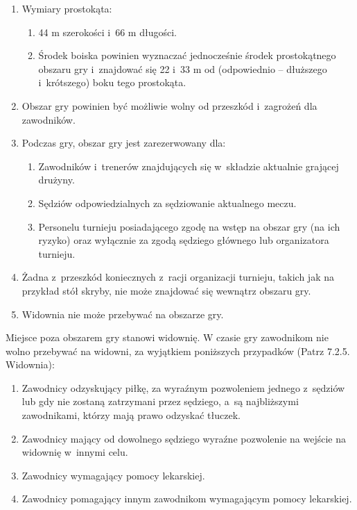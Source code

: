 \documentclass[12pt,a4paper]{article}
\renewcommand{\paragraph}[1]{
  \oldparagraph{#1}%
  \leftskip2cm
}
\begin{document}
\begin{enumerate}
	\item Wymiary prostokąta:
	      \begin{enumerate}
		      \item 44 m szerokości i~66 m długości.
		      \item Środek boiska powinien wyznaczać jednocześnie środek prostokątnego
		            obszaru gry i~znajdować się 22 i~33 m od (odpowiednio -- dłuższego i~krótszego) boku tego prostokąta.
	      \end{enumerate}

	\item Obszar gry powinien być możliwie wolny od przeszkód i~zagrożeń dla
	      zawodników.

	\item Podczas gry, obszar gry jest zarezerwowany dla:
	      \begin{enumerate}
		      \item Zawodników i~trenerów znajdujących się w~składzie aktualnie grającej
		            drużyny.
		      \item Sędziów odpowiedzialnych za sędziowanie aktualnego meczu.
		      \item Personelu turnieju posiadającego zgodę na wstęp na obszar gry (na
		            ich ryzyko) oraz wyłącznie za zgodą sędziego głównego lub
		            organizatora turnieju.
	      \end{enumerate}

	\item Żadna z~przeszkód koniecznych z~racji organizacji turnieju, takich jak
	      na przykład stół skryby, nie może znajdować się wewnątrz obszaru gry.

	\item Widownia nie może przebywać na obszarze gry.
\end{enumerate}

\paragraph{Widownia}
Miejsce poza obszarem gry stanowi widownię.
W czasie gry zawodnikom nie wolno przebywać na widowni, za wyjątkiem
poniższych przypadków (Patrz 7.2.5. Widownia):

\begin{enumerate}
	\item Zawodnicy odzyskujący piłkę, za wyraźnym pozwoleniem jednego z~sędziów lub gdy nie zostaną zatrzymani przez sędziego, a~są najbliższymi zawodnikami, którzy mają prawo odzyskać tłuczek.

	\item Zawodnicy mający od dowolnego sędziego wyraźne pozwolenie na wejście
	      na widownię w~innymi celu.

	\item Zawodnicy wymagający pomocy lekarskiej.

	\item Zawodnicy pomagający innym zawodnikom wymagającym pomocy lekarskiej.
\end{enumerate}
\end{document}
